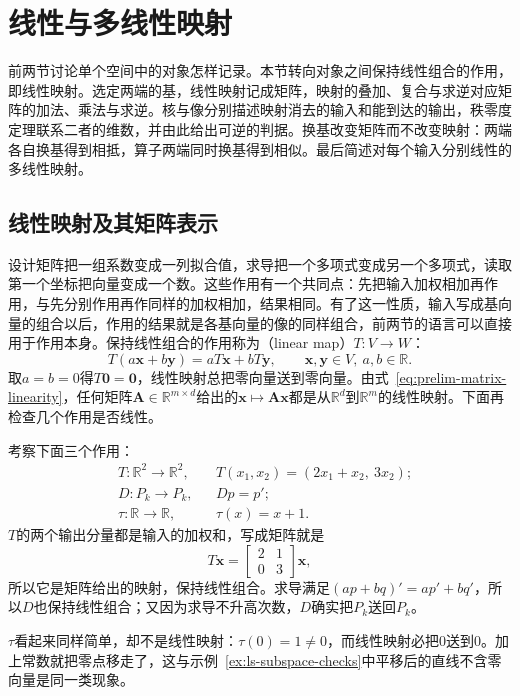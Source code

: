 
\section{线性与多线性映射}
\label{sec:ls-linear-maps}
\label{sec:linear-algebra-matrices-linear-maps}

前两节讨论单个空间中的对象怎样记录。本节转向对象之间保持线性组合的作用，即线性映射。选定两端的基，线性映射记成矩阵，映射的叠加、复合与求逆对应矩阵的加法、乘法与求逆。核与像分别描述映射消去的输入和能到达的输出，秩零度定理联系二者的维数，并由此给出可逆的判据。换基改变矩阵而不改变映射：两端各自换基得到相抵，算子两端同时换基得到相似。最后简述对每个输入分别线性的多线性映射。

\subsection{线性映射及其矩阵表示}
\label{sec:ls-linear-map-definition}
\label{sec:linear-algebra-maps}

设计矩阵把一组系数变成一列拟合值，求导把一个多项式变成另一个多项式，读取第一个坐标把向量变成一个数。这些作用有一个共同点：先把输入加权相加再作用，与先分别作用再作同样的加权相加，结果相同。有了这一性质，输入写成基向量的组合以后，作用的结果就是各基向量的像的同样组合，前两节的语言可以直接用于作用本身。保持线性组合的作用称为（linear map）$T:V\to W$：
\begin{equation}
T(a\bm x+b\bm y)=aT\bm x+bT\bm y,\qquad\bm x,\bm y\in V,\ a,b\in\mathbb R.
\label{eq:ls-linear-map-def}
\end{equation}
取$a=b=0$得$T\bm0=\bm0$，线性映射总把零向量送到零向量。由式~\eqref{eq:prelim-matrix-linearity}，任何矩阵$\bm A\in\mathbb R^{m\times d}$给出的$\bm x\mapsto\bm A\bm x$都是从$\mathbb R^d$到$\mathbb R^m$的线性映射。下面再检查几个作用是否线性。
\begin{example}[线性与非线性的作用]
\label{ex:ls-linear-map-checks}
考察下面三个作用：
\[
 \begin{aligned}
 &T:\mathbb R^2\to\mathbb R^2, &&T(x_1,x_2)=(2x_1+x_2,\ 3x_2);\\
 &D:P_k\to P_k, &&Dp=p';\\
 &\tau:\mathbb R\to\mathbb R, &&\tau(x)=x+1.
 \end{aligned}
\]
$T$的两个输出分量都是输入的加权和，写成矩阵就是
\[
 T\bm x=\begin{bmatrix}2&1\\0&3\end{bmatrix}\bm x,
\]
所以它是矩阵给出的映射，保持线性组合。求导满足$(ap+bq)'=ap'+bq'$，所以$D$也保持线性组合；又因为求导不升高次数，$D$确实把$P_k$送回$P_k$。

$\tau$看起来同样简单，却不是线性映射：$\tau(0)=1\neq0$，而线性映射必把$0$送到$0$。加上常数就把零点移走了，这与示例~\ref{ex:ls-subspace-checks}中平移后的直线不含零向量是同一类现象。
\end{example}

